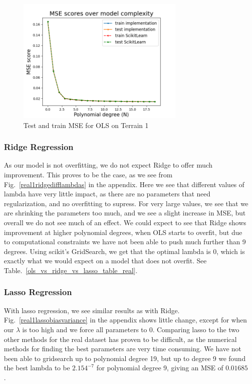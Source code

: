 \documentclass[twocolumn,10pt,cleanfoot]{asme2ej}
\begin{document}
\begin{figure}[h]
\centerline{\includegraphics[width=3.25in]{figure/real1msetraintest.png}}
\caption{Test and train MSE for OLS on Terrain 1}
\label{real1msetraintest}
\end{figure}

\subsubsection{Ridge Regression}

As our model is not overfitting, we do not expect Ridge to offer much improvement. This proves to be the case, as we see from Fig.~\ref{real1ridgedifflambdas} in the appendix. Here we see that different values of lambda have very little impact, as there are no parameters that need regularization, and no overfitting to supress. For very large values, we see that we are shrinking the parameters too much, and we see a slight increase in MSE, but overall we do not see much of an effect. We could expect to see that Ridge shows improvement at higher polynomial degrees, when OLS starts to overfit, but due to computational constraints we have not been able to push much further than 9 degrees. Using scikit's GridSearch, we get that the optimal lambda is 0, which is exactly what we would expect on a model that does not overfit. See Table.~\ref{ols_vs_ridge_vs_lasso_table_real}.

\subsubsection{Lasso Regression}

With lasso regression, we see similar results as with Ridge. Fig.~\ref{real1lassobiasvariance} in the appendix shows little change, except for when our $\lambda$ is too high and we force all parameters to $0$. Comparing lasso to the two other methods for the real dataset has proven to be difficult, as the numerical methods for finding the best parameters are very time consuming. We have not been able to gridsearch up to polynomial degree 19, but up to degree 9 we found the best lambda to be $2.154^{-7}$ for polynomial degree 9, giving an MSE of $0.01685$.
\end{document}

